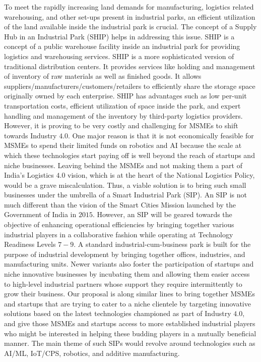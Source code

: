 \documentclass[paper=a4wide, fontsize=12pt]{scrartcl}
\begin{document}
To meet the rapidly increasing land demands for manufacturing, logistics related warehousing, and other set-ups present in industrial parks, an efficient utilization of the land available inside the industrial park is crucial. The concept of a Supply Hub in an Industrial Park (SHIP) helps in addressing this issue. SHIP is a concept of a public warehouse facility inside an industrial park for providing logistics and warehousing services. SHIP is a more sophisticated version of traditional distribution centers. It provides services like holding and management of inventory of raw materials as well as finished goods. It allows suppliers/manufacturers/customers/retailers to efficiently share the storage space originally owned by each enterprise. SHIP has advantages such as low per-unit transportation costs, efficient utilization of space inside the park, and expert handling and management of the inventory by third-party logistics providers. \\

However, it is proving to be very costly and challenging for MSMEs to shift towards Industry $4.0$. One major reason is that it is not economically feasible for MSMEs to spend their limited funds on robotics and AI because the scale at which these technologies start paying off is well beyond the reach of startups and niche businesses. Leaving behind the MSMEs and not making them a part of India's Logistics $4.0$ vision, which is at the heart of the National Logistics Policy, would be a grave miscalculation. Thus, a viable solution is to bring such small businesses under the umbrella of a Smart Industrial Park (SIP). An SIP is not much different than the vision of the Smart Cities Mission launched by the Government of India in $2015$. However, an SIP will be geared towards the objective of enhancing operational efficiencies by bringing together various industrial players in a collaborative fashion while operating at Technology Readiness Levels $7-9$. A standard industrial-cum-business park is built for the purpose of industrial development by bringing together offices, industries, and manufacturing units. Newer variants also foster the participation of startups and niche innovative businesses by incubating them and allowing them easier access to high-level industrial partners whose support they require intermittently to grow their business. Our proposal is along similar lines to bring together MSMEs and startups that are trying to cater to a niche clientele by targeting innovative solutions based on the latest technologies championed as part of Industry $4.0$, and give those MSMEs and startups access to more established industrial players who might be interested in helping these budding players in a mutually beneficial manner. The main theme of such SIPs would revolve around technologies such as AI/ML, IoT/CPS, robotics, and additive manufacturing. \\
\end{document}
